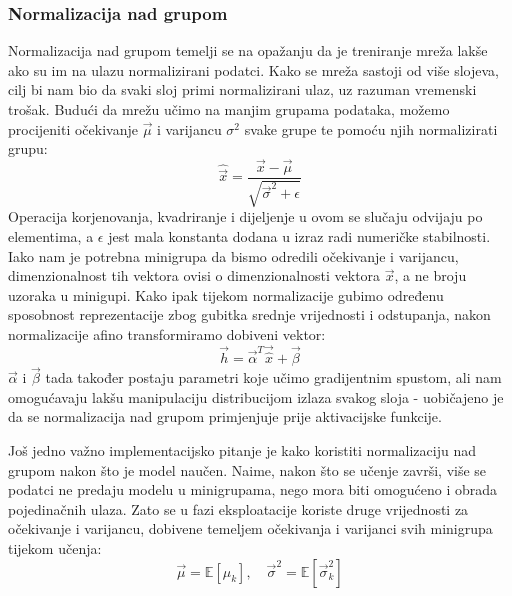 \subsubsection{Normalizacija nad grupom}
Normalizacija nad grupom   temelji se na opažanju da je treniranje mreža lakše ako su im na ulazu normalizirani podatci. Kako se mreža sastoji od više slojeva, cilj bi nam bio da svaki sloj primi normalizirani ulaz, uz razuman vremenski trošak. Budući da mrežu učimo na manjim grupama podataka, možemo procijeniti očekivanje $\vec{\mu}$ i varijancu $\sigma^2$ svake grupe te pomoću njih normalizirati grupu:
\begin{equation}
\hat{\vec{x}} = \frac{\vec{x} - \vec{\mu}}{\sqrt{\vec{\sigma}^2 + \epsilon}}
\end{equation}
Operacija korjenovanja, kvadriranje i dijeljenje u ovom se slučaju odvijaju po elementima, a $\epsilon$ jest mala konstanta dodana u izraz radi numeričke stabilnosti. Iako nam je potrebna minigrupa da bismo odredili očekivanje i varijancu, dimenzionalnost tih vektora ovisi o dimenzionalnosti vektora $\vec{x}$, a ne broju uzoraka u minigupi. Kako ipak tijekom normalizacije gubimo određenu sposobnost reprezentacije zbog gubitka srednje vrijednosti i odstupanja, nakon normalizacije afino transformiramo dobiveni vektor:
\begin{equation}
\label{affine}
\vec{h} = \vec{\alpha}^T\vec{\hat{x}} + \vec{\beta}
\end{equation}
$\vec{\alpha}$ i $\vec{\beta}$ tada također postaju parametri koje učimo gradijentnim spustom, ali nam omogućavaju lakšu manipulaciju distribucijom izlaza svakog sloja - uobičajeno je da se normalizacija nad grupom primjenjuje prije aktivacijske funkcije. 

Još jedno važno implementacijsko pitanje je kako koristiti normalizaciju nad grupom nakon što je model naučen. Naime, nakon što se učenje završi, više se podatci ne predaju modelu u minigrupama, nego mora biti omogućeno i obrada pojedinačnih ulaza. Zato se u fazi eksploatacije koriste druge vrijednosti za očekivanje i varijancu, dobivene temeljem očekivanja i varijanci svih minigrupa tijekom učenja:
\begin{equation}
\vec{\mu} = \mathbb{E}\left[\mu_k\right], \quad \vec{\sigma}^2 = \mathbb{E}\left[\vec{\sigma}^2_k\right]
\end{equation}

